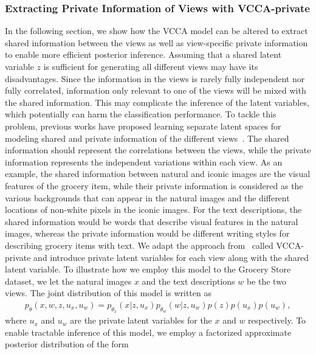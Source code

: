 \subsubsection{Extracting Private Information of Views with VCCA-private}
\label{sec:extracting_private_information}

In the following section, %
we show how the VCCA model can be altered to extract shared information between the views as well as view-specific private information to enable more efficient posterior inference.
Assuming that a shared latent variable $z$ is sufficient for generating all different views may have its disadvantages. Since the information in the views is rarely fully independent nor fully correlated, information only relevant to one of the views will be mixed with the shared information. This may complicate the inference of the latent variables, which potentially can harm the classification performance. To tackle this problem, previous works have proposed learning separate latent spaces for modeling shared and private information of the different views~\cite{salzmann2010factorized,wang2016deep,zhang2016inter}. The shared information should represent the correlations between the views, while the private information represents the independent variations within each view. 
As an example, 
the shared information between natural and iconic images are the visual features of the grocery item, while their private information is considered as the various backgrounds that can appear in the natural images and the different locations of non-white pixels in the iconic images. For the text descriptions, the shared information would be words that describe visual features in the natural images, whereas the private information would be different writing styles for describing grocery items with text.   
We adapt the approach from~\cite{wang2016deep} called VCCA-private and introduce private latent variables for each view along with the shared latent variable.
To illustrate how we employ this model to the Grocery Store dataset, we let the natural images $x$ and the text descriptions $w$ be the two views. The joint distribution of this model is written as 
\begin{align}
    p_{\theta}(x, w, z, u_{x}, u_{w}) = p_{\theta_{x}}(x | z, u_{x}) p_{\theta_{w}}(w | z, u_{w}) p(z) p(u_{x}) p(u_{w}) ,
\end{align}
where $u_{x}$ and $u_{w}$ are the private latent variables for the $x$ and $w$ respectively. To enable tractable inference of this model, we employ a factorized approximate posterior distribution of the form
